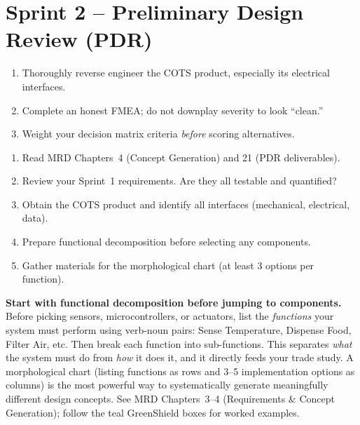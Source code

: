 \section{Sprint 2 -- Preliminary Design Review (PDR)}

\begin{priorities}
\begin{enumerate}[leftmargin=*, itemsep=1pt, topsep=0pt]
    \item Thoroughly reverse engineer the COTS product, especially its electrical interfaces.
    \item Complete an honest FMEA; do not downplay severity to look ``clean.''
    \item Weight your decision matrix criteria \textit{before} scoring alternatives.
\end{enumerate}
\end{priorities}

\begin{checklistbox}
\begin{enumerate}[leftmargin=*, itemsep=1pt, topsep=0pt]
    \item Read MRD Chapters~4 (Concept Generation) and 21 (PDR deliverables).
    \item Review your Sprint~1 requirements. Are they all testable and quantified?
    \item Obtain the COTS product and identify all interfaces (mechanical, electrical, data).
    \item Prepare functional decomposition before selecting any components.
    \item Gather materials for the morphological chart (at least 3 options per function).
\end{enumerate}
\end{checklistbox}

\begin{protip}
\textbf{Start with functional decomposition before jumping to components.} Before picking sensors, microcontrollers, or actuators, list the \textit{functions} your system must perform using verb-noun pairs: Sense Temperature, Dispense Food, Filter Air, etc. Then break each function into sub-functions. This separates \textit{what} the system must do from \textit{how} it does it, and it directly feeds your trade study. A morphological chart (listing functions as rows and 3--5 implementation options as columns) is the most powerful way to systematically generate meaningfully different design concepts. See MRD Chapters~3--4 (Requirements \& Concept Generation); follow the teal GreenShield boxes for worked examples.
\end{protip}

